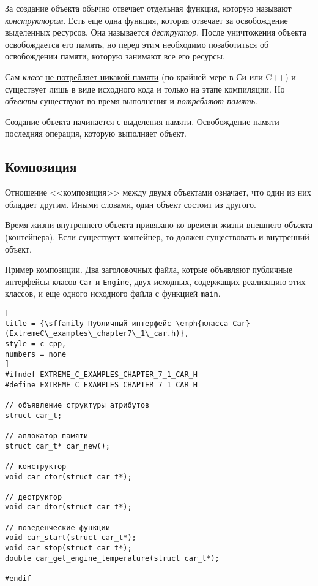 \documentclass[%
	11pt,
	a4paper,
	utf8,
		]{article}
\begin{document}
За создание объекта обычно отвечает отдельная функция, которую называют \emph{конструктором}. Есть еще одна функция, которая отвечает за освобождение выделенных ресурсов. Она называется \emph{деструктор}. После уничтожения объекта освобождается его память, но перед этим необходимо позаботиться об освобождении памяти, которую занимают все его ресурсы.

Сам \emph{класс} \underline{не потребляет никакой памяти} (по крайней мере в Си или C++) и существует лишь в виде исходного кода и только на этапе компиляции. {\color{blue}Но \emph{объекты} существуют во время выполнения и \emph{потребляют память}}.

Создание объекта начинается с выделения памяти. Освобождение памяти -- последняя операция, которую выполняет объект.

\subsection{Композиция}

Отношение <<композиция>> между двумя объектами означает, что один из них обладает другим. Иными словами, один объект состоит из другого.

Время жизни внутреннего объекта привязано ко времени жизни внешнего объекта (контейнера). Если существует контейнер, то должен существовать и внутренний объект.

Пример композиции. Два заголовочных файла, котрые объявляют публичные интерфейсы класов \verb|Car| и \verb|Engine|, двух исходных, содержащих реализацию этих классов, и еще одного исходного файла с функцией \verb|main|.
\begin{lstlisting}[
title = {\sffamily Публичный интерфейс \emph{класса Car} (ExtremeC\_examples\_chapter7\_1\_car.h)},
style = c_cpp,
numbers = none
]
#ifndef EXTREME_C_EXAMPLES_CHAPTER_7_1_CAR_H
#define EXTREME_C_EXAMPLES_CHAPTER_7_1_CAR_H

// объявление структуры атрибутов
struct car_t;

// аллокатор памяти
struct car_t* car_new();

// конструктор
void car_ctor(struct car_t*);

// деструктор
void car_dtor(struct car_t*);

// поведенческие функции
void car_start(struct car_t*);
void car_stop(struct car_t*);
double car_get_engine_temperature(struct car_t*);

#endif
\end{lstlisting}
\end{document}
